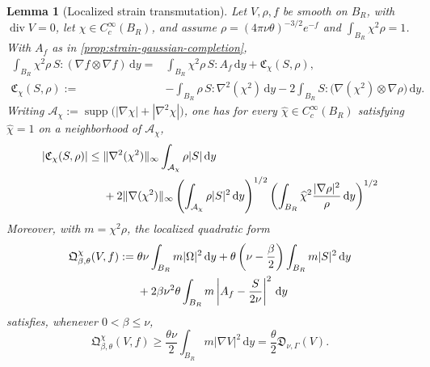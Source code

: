\documentclass[11pt]{amsart}
\numberwithin{equation}{section}
\theoremstyle{plain}
\newtheorem{lemma}[lemma]{Lemma}
\theoremstyle{definition}
\theoremstyle{remark}
\newcommand{\dd}{\,\mathrm d}
\newcommand{\diver}{\operatorname{div}}
\newcommand{\supp}{\operatorname{supp}}
\begin{document}
\begin{lemma}[Localized strain transmutation]
\label{lem:localized-strain-transmutation}
Let \(V,\rho,f\) be smooth on \(B_R\), with \(\diver V=0\), let
\(\chi\in C_c^\infty(B_R)\), and assume
\(\rho=(4\pi\nu\theta)^{-3/2}e^{-f}\) and
\(\int_{B_R}\chi^2\rho=1\).  With \(A_f\) as in
\cref{prop:strain-gaussian-completion},
\begin{align}
 \int_{B_R}\chi^2\rho\,S:(\nabla f\otimes\nabla f)\dd y
 ={}&\int_{B_R}\chi^2\rho\,S:A_f\dd y
 +\mathfrak C_\chi(S,\rho),
 \label{eq:localized-strain-transmutation}\\
 \mathfrak C_\chi(S,\rho)
 :={}&-\int_{B_R}\rho\,S:\nabla^2(\chi^2)\dd y
 -2\int_{B_R}S:
       \bigl(\nabla(\chi^2)\otimes\nabla\rho\bigr)\dd y.
 \label{eq:strain-cutoff-commutator}
\end{align}
Writing
\(\mathcal A_\chi
 :=\supp\bigl(|\nabla\chi|+|\nabla^2\chi|\bigr)\), one has
for every \(\widehat\chi\in C_c^\infty(B_R)\) satisfying
\(\widehat\chi=1\) on a neighborhood of \(\mathcal A_\chi\),
\begin{align}
 |\mathfrak C_\chi(S,\rho)|
 \le{}&\|\nabla^2(\chi^2)\|_\infty
       \int_{\mathcal A_\chi}\rho|S|\dd y
 \notag\\
 &+2\|\nabla(\chi^2)\|_\infty
 \left(\int_{\mathcal A_\chi}\rho|S|^2\dd y\right)^{1/2}
 \left(\int_{B_R}\widehat\chi^2
       \frac{|\nabla\rho|^2}{\rho}\dd y\right)^{1/2}
 \label{eq:strain-cutoff-estimate}
\end{align}
 Moreover, with \(m=\chi^2\rho\), the localized quadratic form
 \begin{align}
  \mathfrak Q_{\beta,\theta}^{\chi}(V,f)
 :={}&\theta\nu\int_{B_R}m|\Omega|^2\dd y
 +\theta\left(\nu-\frac{\beta}{2}\right)
   \int_{B_R}m|S|^2\dd y
 \notag\\
 &+2\beta\nu^2\theta\int_{B_R}m
       \left|A_f-\frac{S}{2\nu}\right|^2\dd y
 \label{eq:localized-coupled-form}
\end{align}
satisfies, whenever \(0<\beta\le\nu\),
\begin{equation}\label{eq:localized-coupled-floor}
 \mathfrak Q_{\beta,\theta}^{\chi}(V,f)
 \ge\frac{\theta\nu}{2}\int_{B_R}m|\nabla V|^2\dd y
 =\frac{\theta}{2}\mathfrak D_{\nu,\Gamma}(V).
\end{equation}
\end{lemma}
\end{document}
